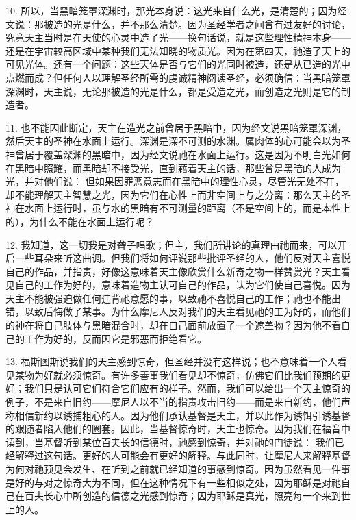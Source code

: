 10. 所以，当黑暗笼罩深渊时，那光本身说：这光来自什么光，是清楚的；因为经文说：那被造的光是什么，并不那么清楚。因为圣经学者之间曾有过友好的讨论，究竟天主当时是在天使的心灵中造了光——换句话说，就是这些理性精神本身——还是在宇宙较高区域中某种我们无法知晓的物质光。因为在第四天，祂造了天上的可见光体。还有一个问题：这些天体是否与它们的光同时被造，还是从已造的光中点燃而成？但任何人以理解圣经所需的虔诚精神阅读圣经，必须确信：当黑暗笼罩深渊时，天主说，无论那被造的光是什么，都是受造之光，而创造之光则是它的制造者。\par

11. 也不能因此断定，天主在造光之前曾居于黑暗中，因为经文说黑暗笼罩深渊，然后天主的圣神在水面上运行。深渊是深不可测的水渊。属肉体的心可能会以为圣神曾居于覆盖深渊的黑暗中，因为经文说祂在水面上运行。这是因为不明白光如何在黑暗中照耀，而黑暗却不接受光，直到藉着天主的话，那些曾是黑暗的人成为光，并对他们说： 但如果因罪恶意志而在黑暗中的理性心灵，尽管光无处不在，却不能理解天主智慧之光，因为它们在心性上而非空间上与之分离：那么天主的圣神在水面上运行时，虽与水的黑暗有不可测量的距离（不是空间上的，而是本性上的），为什么不能在水面上运行呢？\par

12. 我知道，这一切我是对聋子唱歌；但主，我们所讲论的真理由祂而来，可以开启一些耳朵来听这曲调。但我们将如何评说那些批评圣经的人，他们反对天主喜悦自己的作品，并指责，好像这意味着天主像欣赏什么新奇之物一样赞赏光？天主看见自己的工作为好的，意味着造物主认可自己的作品，认为它们使自己喜悦。因为天主不能被强迫做任何违背祂意愿的事，以致祂不喜悦自己的工作；祂也不能出错，以致后悔做了某事。为什么摩尼人反对我们的天主看见祂的工为好的，而他们的神在将自己肢体与黑暗混合时，却在自己面前放置了一个遮盖物？因为他不看自己的工作为好的，反而因它是邪恶而拒绝看它。\par

13. 福斯图斯说我们的天主感到惊奇，但圣经并没有这样说；也不意味着一个人看见某物为好就必须惊奇。有许多善事我们看见却不惊奇，仿佛它们比我们预期的更好；我们只是认可它们符合它们应有的样子。然而，我们可以给出一个天主惊奇的例子，不是来自旧约——摩尼人以不当的指责攻击旧约——而是来自新约，他们声称相信新约以诱捕粗心的人。因为他们承认基督是天主，并以此作为诱饵引诱基督的跟随者陷入他们的圈套。因此，当基督惊奇时，天主也惊奇。因为我们在福音中读到，当基督听到某位百夫长的信德时，祂感到惊奇，并对祂的门徒说： 我们已经解释过这句话。更好的人可能会有更好的解释。与此同时，让摩尼人来解释基督为何对祂预见会发生、在听到之前就已经知道的事感到惊奇。因为虽然看见一件事是好的与对之惊奇大为不同，但在这种情况下有一些相似之处，因为耶稣是对祂自己在百夫长心中所创造的信德之光感到惊奇；因为耶稣是真光，照亮每一个来到世上的人。\par

